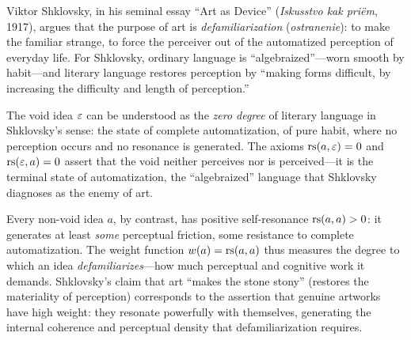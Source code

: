 \begin{interpretation}\label{interp:ch1:shklovsky_void}
Viktor Shklovsky, in his seminal essay ``Art as Device'' (\emph{Iskusstvo kak
pri\"em}, 1917), argues that the purpose of art is \emph{defamiliarization}
(\emph{ostranenie}): to make the familiar strange, to force the perceiver out
of the automatized perception of everyday life. For Shklovsky, ordinary
language is ``algebraized''---worn smooth by habit---and literary language
restores perception by ``making forms difficult, by increasing the difficulty
and length of perception.''

The void idea $\varepsilon$ can be understood as the \emph{zero degree} of literary
language in Shklovsky's sense: the state of complete automatization, of pure
habit, where no perception occurs and no resonance is generated. The axioms
$\mathrm{rs}(a, \varepsilon) = 0$ and $\mathrm{rs}(\varepsilon, a) = 0$ assert that the void neither
perceives nor is perceived---it is the terminal state of automatization,
the ``algebraized'' language that Shklovsky diagnoses as the enemy of art.

Every non-void idea $a$, by contrast, has positive self-resonance
$\mathrm{rs}(a, a) > 0$: it generates at least \emph{some} perceptual friction,
some resistance to complete automatization. The weight function
$w(a) = \mathrm{rs}(a, a)$ thus measures the degree to which an idea
\emph{defamiliarizes}---how much perceptual and cognitive work it demands.
Shklovsky's claim that art ``makes the stone stony'' (restores the
materiality of perception) corresponds to the assertion that genuine
artworks have high weight: they resonate powerfully with themselves,
generating the internal coherence and perceptual density that
defamiliarization requires.
\end{interpretation}

